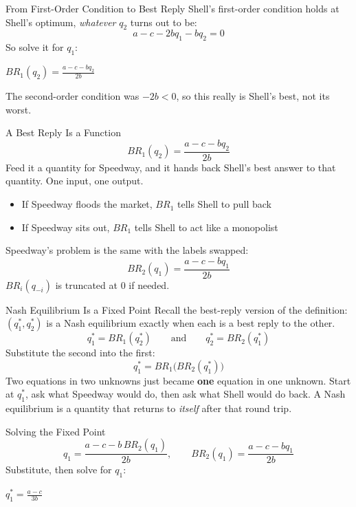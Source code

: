 \begin{frame}{From First-Order Condition to Best Reply}
Shell's first-order condition holds at Shell's optimum, \textit{whatever} $q_2$ turns out
to be:
$$a-c-2bq_1-bq_2=0$$
\bsk
So solve it for $q_1$: \vspace{0.9in}

\centering
$\displaystyle BR_1(q_2)=\frac{a-c-bq_2}{2b}$
\vfill
\raggedright
The second-order condition was $-2b<0$, so this really is Shell's best, not its worst.
\vspace{-0.2in}
\end{frame}

\begin{frame}{A Best Reply Is a Function}
$$BR_1(q_2)=\frac{a-c-bq_2}{2b}$$
\bsk
Feed it a quantity for Speedway, and it hands back Shell's best answer to that quantity.
One input, one output.
\bsk
\begin{itemize}
    \item If Speedway floods the market, $BR_1$ tells Shell to pull back
    \item If Speedway sits out, $BR_1$ tells Shell to act like a monopolist
\end{itemize}
\bsk
Speedway's problem is the same with the labels swapped:
$$BR_2(q_1)=\frac{a-c-bq_1}{2b}$$
\vfill
{\footnotesize $BR_i(q_{-i})$ is truncated at 0 if needed.}
\vspace{-0.3in}
\end{frame}

\begin{frame}{Nash Equilibrium Is a Fixed Point}
Recall the best-reply version of the definition: $(q_1^*,q_2^*)$ is a Nash equilibrium
exactly when each is a best reply to the other.
$$q_1^*=BR_1(q_2^*) \qquad\text{and}\qquad q_2^*=BR_2(q_1^*)$$
\bsk
Substitute the second into the first:
$$q_1^*=BR_1\big(BR_2(q_1^*)\big)$$
\bsk
Two equations in two unknowns just became \textbf{one} equation in one unknown.
\vfill
Start at $q_1^*$, ask what Speedway would do, then ask what Shell would do back. A Nash
equilibrium is a quantity that returns to \textit{itself} after that round trip.
\vspace{0.3in}
\end{frame}

\begin{frame}{Solving the Fixed Point}
$$q_1=\frac{a-c-b\,BR_2(q_1)}{2b},\qquad BR_2(q_1)=\frac{a-c-bq_1}{2b}$$
\bsk
Substitute, then solve for $q_1$: \vspace{2.4in}

\centering
$\displaystyle q_1^*=\frac{a-c}{3b}$
\end{frame}

